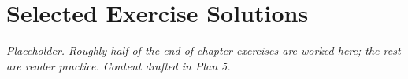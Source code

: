 \chapter{Selected Exercise Solutions}
\label{app:solutions}

\textit{Placeholder. Roughly half of the end-of-chapter exercises are
worked here; the rest are reader practice. Content drafted in Plan 5.}
